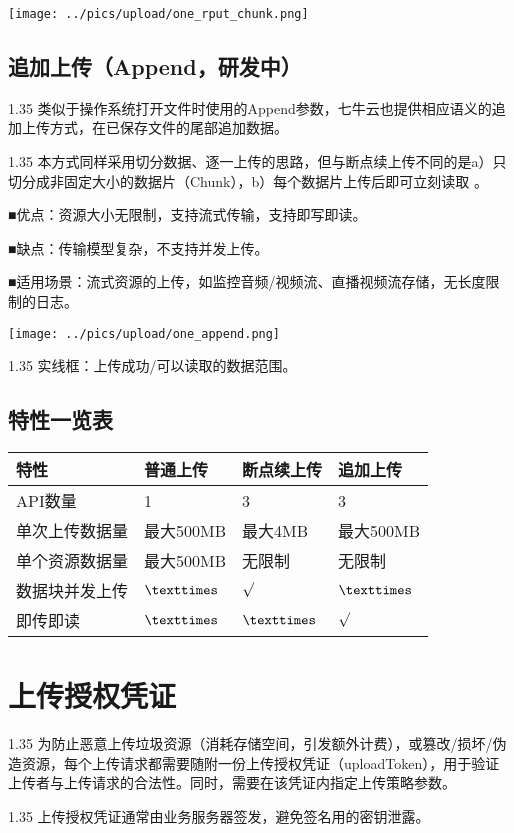 \documentclass[11pt, oneside]{book}
\newcommand{\qpara}[1]{
\vspace{0.2em}
\begin{spacing}{1.35}
\noindent
#1\par
\end{spacing}
\vspace{0.2em}
}
\newcommand{\qblock}[1]{
\vspace{0.1em}
\noindent
#1\par
\vspace{0.1em}
}
\newcommand{\qtable}[1]{\footnotesize\vspace{0.5em}#1\vspace{0.5em}\normalsize}
\begin{document}
\begin{center}
\texttt{[image: ../pics/upload/one\_rput\_chunk.png]}
\end{center}

\section{追加上传（Append，研发中）}

\qpara{类似于操作系统打开文件时使用的Append参数，七牛云也提供相应语义的追加上传方式，在已保存文件的尾部追加数据。}
\qpara{本方式同样采用切分数据、逐一上传的思路，但与断点续上传不同的是a）只切分成非固定大小的数据片（Chunk），b）每个数据片上传后即可立刻读取 。}
\qblock{■\thinspace 优点：资源大小无限制，支持流式传输，支持即写即读。}
\qblock{■\thinspace 缺点：传输模型复杂，不支持并发上传。}
\qblock{■\thinspace 适用场景：流式资源的上传，如监控音频/视频流、直播视频流存储，无长度限制的日志。}

\begin{center}
\texttt{[image: ../pics/upload/one\_append.png]}
\end{center}

\qpara{实线框：上传成功/可以读取的数据范围。}

\section{特性一览表}

\qtable{
\def\arraystretch{2}
\begin{tabular}{|l|p{10em}|p{10em}|p{10em}|}
\hline
特性 & 普通上传 & 断点续上传 & 追加上传 \\
\hline
API数量 & 1 & 3 & 3 \\
\hline
单次上传数据量 & 最大500MB & 最大4MB & 最大500MB \\
\hline
单个资源数据量 & 最大500MB & 无限制 & 无限制 \\
\hline
数据块并发上传 & ${\texttimes}$ & ${\surd}$ & ${\texttimes}$ \\
\hline
即传即读 & ${\texttimes}$ & ${\texttimes}$ & ${\surd}$ \\
\hline
\end{tabular}
}

\clearpage

\chapter{上传授权凭证}

\qpara{为防止恶意上传垃圾资源（消耗存储空间，引发额外计费），或篡改/损坏/伪造资源，每个上传请求都需要随附一份上传授权凭证（uploadToken），用于验证上传者与上传请求的合法性。同时，需要在该凭证内指定上传策略参数。}
\qpara{上传授权凭证通常由业务服务器签发，避免签名用的密钥泄露。}
\end{document}
